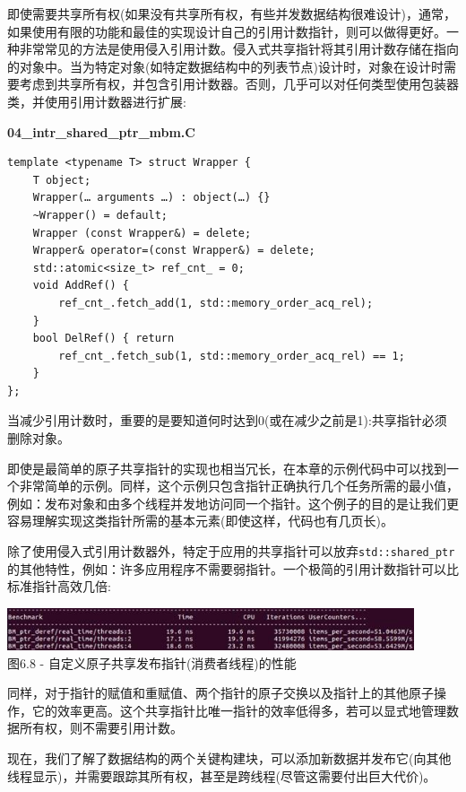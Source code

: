 即使需要共享所有权(如果没有共享所有权，有些并发数据结构很难设计)，通常，如果使用有限的功能和最佳的实现设计自己的引用计数指针，则可以做得更好。一种非常常见的方法是使用侵入引用计数。侵入式共享指针将其引用计数存储在指向的对象中。当为特定对象(如特定数据结构中的列表节点)设计时，对象在设计时需要考虑到共享所有权，并包含引用计数器。否则，几乎可以对任何类型使用包装器类，并使用引用计数器进行扩展:

\noindent
\textbf{04\_intr\_shared\_ptr\_mbm.C}
\begin{lstlisting}[style=styleCXX]
template <typename T> struct Wrapper {
	T object;
	Wrapper(… arguments …) : object(…) {}
	~Wrapper() = default;
	Wrapper (const Wrapper&) = delete;
	Wrapper& operator=(const Wrapper&) = delete;
	std::atomic<size_t> ref_cnt_ = 0;
	void AddRef() {
		ref_cnt_.fetch_add(1, std::memory_order_acq_rel);
	}
	bool DelRef() { return
		ref_cnt_.fetch_sub(1, std::memory_order_acq_rel) == 1;
	}
};
\end{lstlisting}

当减少引用计数时，重要的是要知道何时达到0(或在减少之前是1):共享指针必须删除对象。

即使是最简单的原子共享指针的实现也相当冗长，在本章的示例代码中可以找到一个非常简单的示例。同样，这个示例只包含指针正确执行几个任务所需的最小值，例如：发布对象和由多个线程并发地访问同一个指针。这个例子的目的是让我们更容易理解实现这类指针所需的基本元素(即使这样，代码也有几页长)。

除了使用侵入式引用计数器外，特定于应用的共享指针可以放弃\texttt{std::shared\_ptr}的其他特性，例如：许多应用程序不需要弱指针。一个极简的引用计数指针可以比标准指针高效几倍:

\begin{center}
\includegraphics[width=0.9\textwidth]{content/2/chapter6/images/8.jpg}\\
图6.8 - 自定义原子共享发布指针(消费者线程)的性能
\end{center}

同样，对于指针的赋值和重赋值、两个指针的原子交换以及指针上的其他原子操作，它的效率更高。这个共享指针比唯一指针的效率低得多，若可以显式地管理数据所有权，则不需要引用计数。

现在，我们了解了数据结构的两个关键构建块，可以添加新数据并发布它(向其他线程显示)，并需要跟踪其所有权，甚至是跨线程(尽管这需要付出巨大代价)。




















